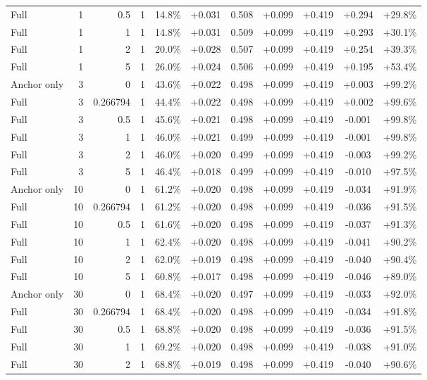\begin{table}[htbp]
\begin{tabular}{lrrrccccccc}
Full & 1 & 0.5 & 1 & 14.8\% & +0.031 & 0.508 & +0.099 & +0.419 & +0.294 & +29.8\% \\
Full & 1 & 1 & 1 & 14.8\% & +0.031 & 0.509 & +0.099 & +0.419 & +0.293 & +30.1\% \\
Full & 1 & 2 & 1 & 20.0\% & +0.028 & 0.507 & +0.099 & +0.419 & +0.254 & +39.3\% \\
Full & 1 & 5 & 1 & 26.0\% & +0.024 & 0.506 & +0.099 & +0.419 & +0.195 & +53.4\% \\
Anchor only & 3 & 0 & 1 & 43.6\% & +0.022 & 0.498 & +0.099 & +0.419 & +0.003 & +99.2\% \\
Full & 3 & 0.266794 & 1 & 44.4\% & +0.022 & 0.498 & +0.099 & +0.419 & +0.002 & +99.6\% \\
Full & 3 & 0.5 & 1 & 45.6\% & +0.021 & 0.498 & +0.099 & +0.419 & -0.001 & +99.8\% \\
Full & 3 & 1 & 1 & 46.0\% & +0.021 & 0.499 & +0.099 & +0.419 & -0.001 & +99.8\% \\
Full & 3 & 2 & 1 & 46.0\% & +0.020 & 0.499 & +0.099 & +0.419 & -0.003 & +99.2\% \\
Full & 3 & 5 & 1 & 46.4\% & +0.018 & 0.499 & +0.099 & +0.419 & -0.010 & +97.5\% \\
Anchor only & 10 & 0 & 1 & 61.2\% & +0.020 & 0.498 & +0.099 & +0.419 & -0.034 & +91.9\% \\
Full & 10 & 0.266794 & 1 & 61.2\% & +0.020 & 0.498 & +0.099 & +0.419 & -0.036 & +91.5\% \\
Full & 10 & 0.5 & 1 & 61.6\% & +0.020 & 0.498 & +0.099 & +0.419 & -0.037 & +91.3\% \\
Full & 10 & 1 & 1 & 62.4\% & +0.020 & 0.498 & +0.099 & +0.419 & -0.041 & +90.2\% \\
Full & 10 & 2 & 1 & 62.0\% & +0.019 & 0.498 & +0.099 & +0.419 & -0.040 & +90.4\% \\
Full & 10 & 5 & 1 & 60.8\% & +0.017 & 0.498 & +0.099 & +0.419 & -0.046 & +89.0\% \\
Anchor only & 30 & 0 & 1 & 68.4\% & +0.020 & 0.497 & +0.099 & +0.419 & -0.033 & +92.0\% \\
Full & 30 & 0.266794 & 1 & 68.4\% & +0.020 & 0.498 & +0.099 & +0.419 & -0.034 & +91.8\% \\
Full & 30 & 0.5 & 1 & 68.8\% & +0.020 & 0.498 & +0.099 & +0.419 & -0.036 & +91.5\% \\
Full & 30 & 1 & 1 & 69.2\% & +0.020 & 0.498 & +0.099 & +0.419 & -0.038 & +91.0\% \\
Full & 30 & 2 & 1 & 68.8\% & +0.019 & 0.498 & +0.099 & +0.419 & -0.040 & +90.6\% \\

\end{tabular}
\end{table}
